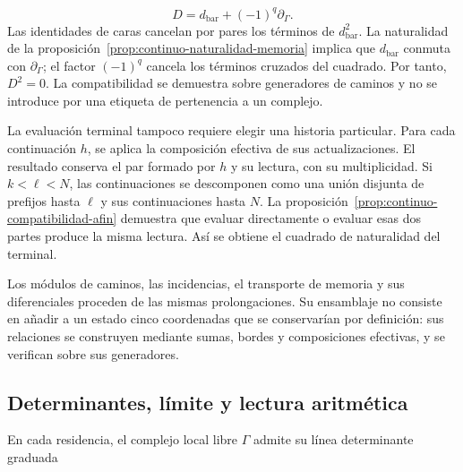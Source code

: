 \[
D=d_{\mathrm{bar}}+(-1)^q\partial_\Gamma.
\]
Las identidades de caras cancelan por pares los términos de \(d_{\mathrm{bar}}^2\). La naturalidad de la proposición~\ref{prop:continuo-naturalidad-memoria} implica que \(d_{\mathrm{bar}}\) conmuta con \(\partial_\Gamma\); el factor \((-1)^q\) cancela los términos cruzados del cuadrado. Por tanto, \(D^2=0\). La compatibilidad se demuestra sobre generadores de caminos y no se introduce por una etiqueta de pertenencia a un complejo.

La evaluación terminal tampoco requiere elegir una historia particular. Para cada continuación \(h\), se aplica la composición efectiva de sus actualizaciones. El resultado conserva el par formado por \(h\) y su lectura, con su multiplicidad. Si \(k<\ell<N\), las continuaciones se descomponen como una unión disjunta de prefijos hasta \(\ell\) y sus continuaciones hasta \(N\). La proposición~\ref{prop:continuo-compatibilidad-afin} demuestra que evaluar directamente o evaluar esas dos partes produce la misma lectura. Así se obtiene el cuadrado de naturalidad del terminal.

Los módulos de caminos, las incidencias, el transporte de memoria y sus diferenciales proceden de las mismas prolongaciones. Su ensamblaje no consiste en añadir a un estado cinco coordenadas que se conservarían por definición: sus relaciones se construyen mediante sumas, bordes y composiciones efectivas, y se verifican sobre sus generadores.

\subsection{Determinantes, límite y lectura aritmética}
En cada residencia, el complejo local libre \(\Gamma\) admite su línea determinante graduada

